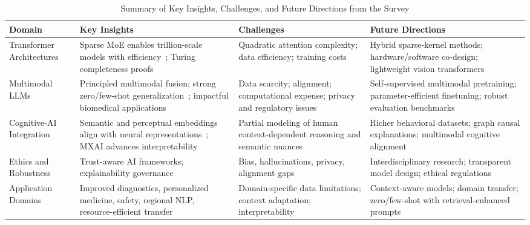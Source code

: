 \documentclass[sigconf]{acmart}
\begin{document}
\begin{table*}[htbp]
\centering
\caption{Summary of Key Insights, Challenges, and Future Directions from the Survey}
\label{tab:conclusion_summary}
\begin{adjustbox}{max width=\textwidth}
\begin{tabular}{@{}llll@{}}
\toprule
\textbf{Domain} & \textbf{Key Insights} & \textbf{Challenges} & \textbf{Future Directions} \\
\midrule
Transformer Architectures & 
Sparse MoE enables trillion-scale models with efficiency~\cite{ref14}; Turing completeness proofs~\cite{ref15} & 
Quadratic attention complexity; data efficiency; training costs~\cite{ref21,ref22} & 
Hybrid sparse-kernel methods; hardware/software co-design; lightweight vision transformers~\cite{ref21,ref22} \\
\addlinespace
Multimodal LLMs &
Principled multimodal fusion; strong zero/few-shot generalization~\cite{ref28}; impactful biomedical applications~\cite{ref12} & 
Data scarcity; alignment; computational expense; privacy and regulatory issues~\cite{ref12,ref28} & 
Self-supervised multimodal pretraining; parameter-efficient finetuning; robust evaluation benchmarks~\cite{ref28} \\
\addlinespace
Cognitive-AI Integration &
Semantic and perceptual embeddings align with neural representations~\cite{ref23}; MXAI advances interpretability~\cite{ref25,ref26} & 
Partial modeling of human context-dependent reasoning and semantic nuances~\cite{ref24} & 
Richer behavioral datasets; graph causal explanations; multimodal cognitive alignment~\cite{ref24,ref26} \\
\addlinespace
Ethics and Robustness &
Trust-aware AI frameworks; explainability governance~\cite{ref11,ref25,ref28} & 
Bias, hallucinations, privacy, alignment gaps~\cite{ref29,ref30} & 
Interdisciplinary research; transparent model design; ethical regulations~\cite{ref29,ref30} \\
\addlinespace
Application Domains &
Improved diagnostics, personalized medicine, safety, regional NLP, resource-efficient transfer~\cite{ref21,ref22,ref27,ref30,ref31} & 
Domain-specific data limitations; context adaptation; interpretability~\cite{ref21,ref30} & 
Context-aware models; domain transfer; zero/few-shot with retrieval-enhanced prompts~\cite{ref34,ref40} \\
\bottomrule
\end{tabular}
\end{adjustbox}
\end{table*}
\end{document}
